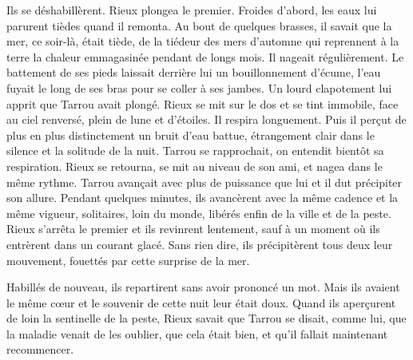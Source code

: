 \documentclass[french,twoside]{book} %
\begin{document}
Ils se déshabillèrent. Rieux plongea le premier. Froides d’abord, les eaux lui parurent tièdes quand il remonta. Au bout de quelques brasses, il savait que la mer, ce soir-là, était tiède, de la tiédeur des mers d’automne qui reprennent à la terre la chaleur emmagasinée pendant de longs mois. Il nageait régulièrement. Le battement de ses pieds laissait derrière lui un bouillonnement d’écume, l’eau fuyait le long de ses bras pour se coller à ses jambes. Un lourd clapotement lui apprit que Tarrou avait plongé. Rieux se mit sur le dos et se tint immobile, face au ciel renversé, plein de lune et d’étoiles. Il respira longuement. Puis il perçut de plus en plus distinctement un bruit d’eau battue, étrangement clair dans le silence et la solitude de la nuit. Tarrou se rapprochait, on entendit bientôt sa respiration. Rieux se retourna, se mit au niveau de son ami, et nagea dans le même rythme. Tarrou avançait avec plus de puissance que lui et il dut précipiter son allure. Pendant quelques minutes, ils avancèrent avec la même cadence et la même vigueur, solitaires, loin du monde, libérés enfin de la ville et de la peste. Rieux s’arrêta le premier et ils revinrent lentement, sauf à un moment où ils entrèrent dans un courant glacé. Sans rien dire, ils précipitèrent tous deux leur mouvement, fouettés par cette surprise de la mer.\par
Habillés de nouveau, ils repartirent sans avoir prononcé un mot. Mais ils avaient le même cœur et le souvenir de cette nuit leur était doux. Quand ils aperçurent de loin la sentinelle de la peste, Rieux savait que Tarrou se disait, comme lui, que la maladie venait de les oublier, que cela était bien, et qu’il fallait maintenant recommencer.
\end{document}

